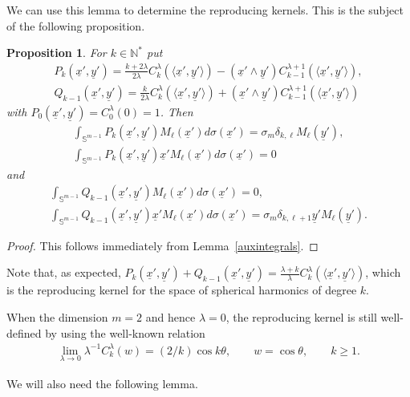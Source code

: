 \documentclass[11pt]{article}
\newtheorem{proposition}{Proposition}
\numberwithin{equation}{section}
\numberwithin{theorem}{section}
\numberwithin{proposition}{section}
\numberwithin{lemma}{section}
\numberwithin{corollary}{section}
\numberwithin{definition}{section}
\numberwithin{example}{section}
\numberwithin{remark}{section}
\numberwithin{note}{section}
\theoremstyle{remark}
\newcommand{\mN}{\mathbb{N}}
\newcommand{\mS}{\mathbb{S}}
\newcommand{\ux}{\underline{x}}
\newcommand{\uy}{\underline{y}}
\def\l{{\lambda}}
\def\s{{\sigma}}
\def\la{{\langle}}
\def\ra{{\rangle}}
\begin{document}
We can use this lemma to determine the reproducing kernels.
This is the subject of the following proposition.

\begin{proposition}
\label{reprkernels}
For $k\in\mN^{*}$ put
\begin{gather*}
P_{k}(\ux', \uy') = \frac{k+2\l}{2\l} C_{k}^{\l}(\la\ux', \uy' \ra) -(\ux' \wedge \uy' )
C_{k-1}^{\lambda+1}(\la\ux', \uy' \ra),\\
Q_{k-1}(\ux', \uy') = \frac{k}{2\l} C_{k}^{\l}(\la\ux', \uy' \ra) +(\ux' \wedge \uy' )
C_{k-1}^{\lambda+1}(\la\ux', \uy' \ra)
\end{gather*}
with $P_{0}(\ux',\uy')=C_{0}^{\l}(0)=1$.
Then
\begin{gather*}
\int_{\mS^{m-1}} P_{k}(\ux', \uy') M_{\ell}(\ux')d \s (\ux') = \sigma_m \delta_{k, \ell}
M_{\ell}(\uy'),\\
\int_{\mS^{m-1}} P_{k}(\ux', \uy') \ux'M_{\ell}(\ux')d \s (\ux') = 0
\end{gather*}
and
\begin{gather*}
\int_{\mS^{m-1}} Q_{k-1}(\ux', \uy') M_{\ell}(\ux')d \s (\ux') = 0,\\
\int_{\mS^{m-1}} Q_{k-1}(\ux', \uy') \ux'M_{\ell}(\ux')d \s (\ux') = \sigma_m \delta_{k, \ell+1}
\uy'M_{\ell}(\uy').
\end{gather*}
\end{proposition}

\begin{proof}
This follows immediately from Lemma~\ref{auxintegrals}.
\end{proof}

\begin{remark}
Note that, as expected, $P_{k}(\ux',\uy')+Q_{k-1}(\ux',\uy')=
\frac{\l+k}{\l}C_{k}^{\l}(\la\ux',\uy'\ra)$, which is the reproducing kernel for the space of
spherical harmonics of degree $k$.
\end{remark}

\begin{remark}
When the dimension $m=2$ and hence $\lambda=0$, the reproducing kernel is still well-def\/ined by
using the well-known relation~\cite[(4.7.8)]{Sz}
\begin{gather*}
\lim_{\lambda\rightarrow0}\lambda^{-1}C_k^\lambda(w)=(2/k)\cos k\theta,\qquad w=\cos
\theta,\qquad k\geq1.
\end{gather*}
\end{remark}

We will also need the following lemma.
\end{document}
